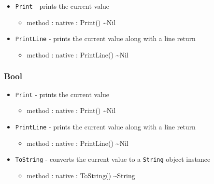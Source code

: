 \documentclass[11pt]{article}
\begin{document}
\begin{itemize}
\begin{itemize}
  \end{itemize}
\item \texttt{Print} - prints the current value
  \begin{itemize}
  \item method : native : Print() \textasciitilde Nil
  \end{itemize}
\item \texttt{PrintLine} - prints the current value along with a line
  return
  \begin{itemize}
  \item method : native : PrintLine() \textasciitilde Nil
  \end{itemize}
\end{itemize}

\subsubsection{Bool}
\begin{itemize}
\item \texttt{Print} - prints the current value
  \begin{itemize}
  \item method : native : Print() \textasciitilde Nil
  \end{itemize}
\item \texttt{PrintLine} - prints the current value along with a line
  return
  \begin{itemize}
  \item method : native : PrintLine() \textasciitilde Nil
  \end{itemize}
\item \texttt{ToString} - converts the current value to a
  \texttt{String} object instance
  \begin{itemize}
  \item method : native : ToString() \textasciitilde String
  \end{itemize}
\end{itemize}
\end{document}
